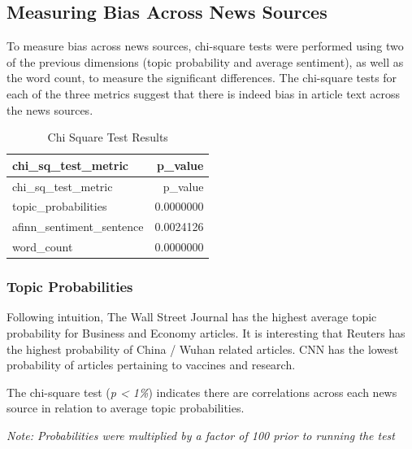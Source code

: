 \documentclass[
]{article}
\begin{document}
\hypertarget{measuring-bias-across-news-sources}{%
\subsection{Measuring Bias Across News
Sources}\label{measuring-bias-across-news-sources}}

To measure bias across news sources, chi-square tests were performed
using two of the previous dimensions (topic probability and average
sentiment), as well as the word count, to measure the significant
differences. The chi-square tests for each of the three metrics suggest
that there is indeed bias in article text across the news sources.

\begin{longtable}[]{@{}lr@{}}
\caption{Chi Square Test Results}\tabularnewline
\toprule
chi\_sq\_test\_metric & p\_value\tabularnewline
\midrule
\endfirsthead
\toprule
chi\_sq\_test\_metric & p\_value\tabularnewline
\midrule
\endhead
topic\_probabilities & 0.0000000\tabularnewline
afinn\_sentiment\_sentence & 0.0024126\tabularnewline
word\_count & 0.0000000\tabularnewline
\bottomrule
\end{longtable}

\hypertarget{topic-probabilities}{%
\subsubsection{Topic Probabilities}\label{topic-probabilities}}

Following intuition, The Wall Street Journal has the highest average
topic probability for Business and Economy articles. It is interesting
that Reuters has the highest probability of China / Wuhan related
articles. CNN has the lowest probability of articles pertaining to
vaccines and research.

The chi-square test (\emph{p \textless{} 1\%}) indicates there are
correlations across each news source in relation to average topic
probabilities.

\emph{Note: Probabilities were multiplied by a factor of 100 prior to
running the test}
\end{document}
